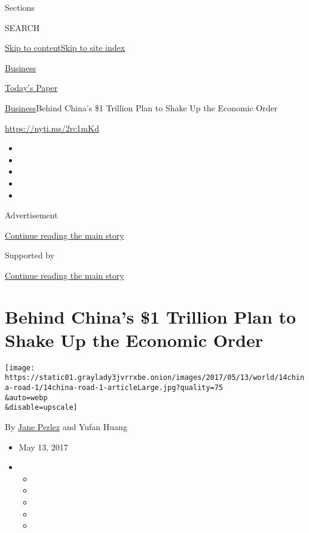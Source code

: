 Sections

SEARCH

\protect\hyperlink{site-content}{Skip to
content}\protect\hyperlink{site-index}{Skip to site index}

\href{https://www.nytimes3xbfgragh.onion/section/business}{Business}

\href{https://myaccount.nytimes3xbfgragh.onion/auth/login?response_type=cookie\&client_id=vi}{}

\href{https://www.nytimes3xbfgragh.onion/section/todayspaper}{Today's
Paper}

\href{/section/business}{Business}\textbar{}Behind China's \$1 Trillion
Plan to Shake Up the Economic Order

\url{https://nyti.ms/2rc1mKd}

\begin{itemize}
\item
\item
\item
\item
\item
\end{itemize}

Advertisement

\protect\hyperlink{after-top}{Continue reading the main story}

Supported by

\protect\hyperlink{after-sponsor}{Continue reading the main story}

\hypertarget{behind-chinas-1-trillion-plan-to-shake-up-the-economic-order}{%
\section{Behind China's \$1 Trillion Plan to Shake Up the Economic
Order}\label{behind-chinas-1-trillion-plan-to-shake-up-the-economic-order}}

\texttt{[image: https://static01.graylady3jvrrxbe.onion/images/2017/05/13/world/14china-road-1/14china-road-1-articleLarge.jpg?quality=75\\\&auto=webp\\\&disable=upscale]}

By \href{http://www.nytimes3xbfgragh.onion/by/jane-perlez}{Jane Perlez}
and Yufan Huang

\begin{itemize}
\item
  May 13, 2017
\item
  \begin{itemize}
  \item
  \item
  \item
  \item
  \item
  \end{itemize}
\end{itemize}

